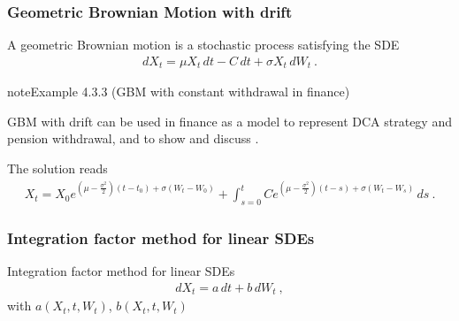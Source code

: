 \documentclass[letterpaper,10pt,english]{jupyterBook}
\begin{document}
\subsubsection{Geometric Brownian Motion with drift}
\label{\detokenize{ch/prob/processes-calculus:geometric-brownian-motion-with-drift}}\label{\detokenize{ch/prob/processes-calculus:prob-processes-calculus-ito-process-gbm-drift}}
\sphinxAtStartPar
A geometric Brownian motion is a stochastic process satisfying the SDE
\begin{equation*}
\begin{split}d X_t = \mu X_t \, dt - C \, dt + \sigma X_t \, dW_t \ .\end{split}
\end{equation*}\label{ch/prob/processes-calculus:example:gbm-drift:finance}
\begin{sphinxadmonition}{note}{Example 4.3.3 (GBM with constant withdrawal in finance)}



\sphinxAtStartPar
GBM with drift can be used in finance as a model to represent DCA strategy and pension withdrawal, and to show and discuss .
\end{sphinxadmonition}

\sphinxAtStartPar
The solution reads
\begin{equation*}
\begin{split}X_t = X_0 e^{\left( \mu - \frac{\sigma^2}{2} \right) (t-t_0) + \sigma ( W_t - W_0)} + \int_{s=0}^{t} C e^{\left( \mu - \frac{\sigma^2}{2} \right) (t-s) + \sigma ( W_t - W_s)} \, ds \ .\end{split}
\end{equation*}\subsubsection*{Integration factor method for linear SDEs}

\sphinxAtStartPar
Integration factor method for linear SDEs
\begin{equation*}
\begin{split}d X_t = a \, dt + b \, dW_t \ ,\end{split}
\end{equation*}
\sphinxAtStartPar
with \(a(X_t, t, W_t)\), \(b(X_t, t, W_t)\)
\end{document}
